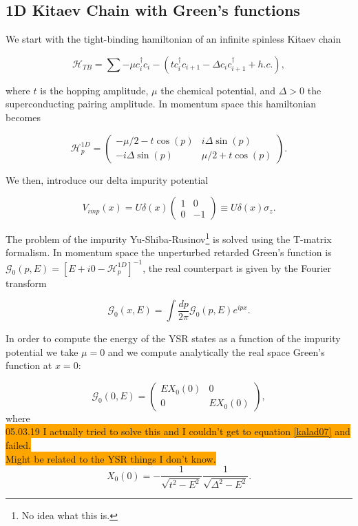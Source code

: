 \subsection{1D Kitaev Chain with Green's functions}

We start with the tight-binding hamiltonian of an infinite spinless Kitaev chain

\begin{equation}
    \mathcal{H}_{TB} = \sum -\mu c_i^\dagger c_i - \left(tc_i^\dagger c_{i+1} - \Delta c_i c_{i+1}^\dagger + h.c. \right),
\end{equation}

where $t$ is the hopping amplitude, $\mu$ the chemical potential, and $\Delta > 0$ the superconducting pairing amplitude. In momentum space this hamiltonian becomes

\begin{equation}
    \mathcal{H}_p^{1D} =
    \begin{pmatrix}
     -\mu/2 - t\cos(p) & i\Delta \sin(p)\\
     -i\Delta \sin(p) & \mu/2 + t\cos(p)
    \end{pmatrix}.
\end{equation}

We then, introduce our delta impurity potential

\begin{equation}
    V_{imp}(x) = U\delta(x)\begin{pmatrix}
    1&0\\
    0&-1
    \end{pmatrix} \equiv U\delta(x)\sigma_z.
    \label{kaladz06}
\end{equation}

The problem of the impurity Yu-Shiba-Rusinov\footnote{No idea what this is.} is solved using the T-matrix formalism. In momentum space the unperturbed retarded Green's function is $\mathcal{G}_0(p,E) = [E+i0-\mathcal{H}_p^{1D}]^{-1}$, the real counterpart is given by the Fourier transform

\begin{equation}
    \mathcal{G}_0(x,E) = \int \frac{dp}{2\pi}\mathcal{G}_0(p,E)e^{ipx}.
\end{equation}

In order to compute the energy of the YSR states as a function of the impurity potential we take $\mu=0$ and we compute analytically the real space Green's function at $x=0$: 

\begin{equation}
    \mathcal{G}_0(0,E) = \begin{pmatrix}
    EX_0(0) & 0\\
    0 & EX_0(0)
    \end{pmatrix},
    \label{kalad07}
\end{equation}
where\\
\colorbox{orange}{05.03.19 I actually tried to solve this and I couldn't get to equation \ref{kalad07} and failed. }\\
\colorbox{orange}{Might be related to the YSR things I don't know.}
\begin{equation}
    X_0(0) = -\frac{1}{\sqrt{t^2 - E^2}}\frac{1}{\sqrt{\Delta^2 - E^2}}.
\end{equation}

